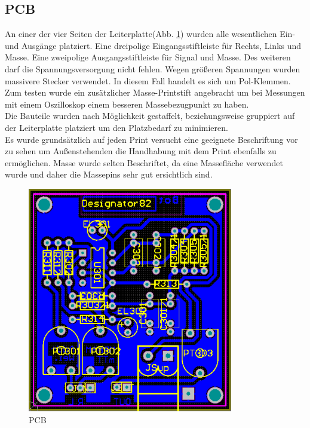 \subsection{PCB}\label{subsec:5.1.4}
An einer der vier Seiten der Leiterplatte(Abb. \ref{fig:5.1.4.1}) wurden alle wesentlichen Ein- und Ausgänge platziert. Eine dreipolige Eingangsstiftleiste für Rechts, Links und Masse. Eine zweipolige Ausgangsstiftleiste für Signal und Masse. Des weiteren darf die Spannungsversorgung nicht fehlen. Wegen größeren Spannungen wurden massivere Stecker verwendet. In diesem Fall handelt es sich um Pol-Klemmen. Zum testen wurde ein zusätzlicher Masse-Printstift angebracht um bei Messungen mit einem Oszilloskop einem besseren Massebezugpunkt zu haben.\\
Die Bauteile wurden nach Möglichkeit gestaffelt, beziehungsweise gruppiert auf der Leiterplatte platziert um den Platzbedarf zu minimieren.\\
Es wurde grundsätzlich auf jeden Print versucht eine geeignete Beschriftung vor zu sehen um Außenstehenden die Handhabung mit dem Print ebenfalls zu ermöglichen. Masse wurde selten Beschriftet, da eine Massefläche verwendet wurde und daher die Massepins sehr gut ersichtlich sind.
\begin{figure} [H]
	\centering
	\includegraphics[width=0.8\textwidth]{img/Print3/3mTTWeicheruAddierer-PCB.PNG}
	\caption{PCB}
	\label {fig:5.1.4.1}
\end{figure}









